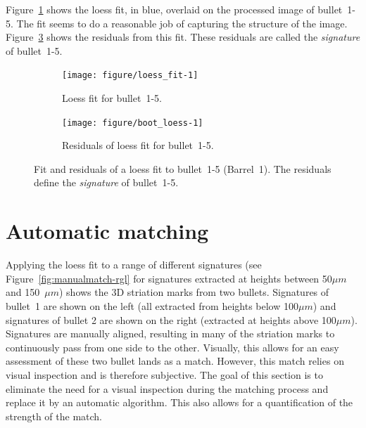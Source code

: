 \documentclass[aoas, preprint]{imsart}\usepackage[]{graphicx}\usepackage[]{color}
\newenvironment{knitrout}{}{} %
\begin{document}
Figure~\ref{fig:loess_fit} shows the loess fit, in blue, overlaid on the processed image of bullet~1-5. The fit seems to do a reasonable job of capturing the structure of the image. %
Figure~\ref{fig:loess_resid} shows the residuals from this fit. These residuals are called the \emph{signature} of bullet~1-5.
%
\begin{figure}[hbtp]
  \centering
\begin{subfigure}[b]{.49\textwidth}\centering
\caption{\label{fig:loess_fit} Loess fit for bullet~1-5.}
\begin{knitrout}
\color{fgcolor}
\texttt{[image: figure/loess\_fit-1]} 

\end{knitrout}
\end{subfigure}
\begin{subfigure}[b]{.49\textwidth}\centering
\caption{\label{fig:loess_resid} Residuals of loess fit for bullet~1-5.
}
\begin{knitrout}
\color{fgcolor}
\texttt{[image: figure/boot\_loess-1]} 

\end{knitrout}
\end{subfigure}
\caption{Fit and residuals of a loess fit to bullet~1-5 (Barrel~1). The residuals define the {\it signature} of bullet~1-5. %
}
\end{figure}
%

\section{Automatic matching}
Applying the loess fit to a range of different signatures (see Figure~\ref{fig:manualmatch-rgl} for signatures extracted at heights between 50$\mu m$ and 150~$\mu m$) shows the 3D striation marks from two bullets. Signatures of bullet~1 are shown on the left (all extracted from heights below 100$\mu m$) and signatures of bullet 2 are shown on the right (extracted at heights above 100$\mu m$). Signatures are manually aligned, resulting in many of the striation marks to continuously pass from one side to the other. Visually, this allows for an easy assessment of these two bullet lands as a match. However, this match relies on visual inspection and is therefore subjective.  The goal of this section is to eliminate the need for a visual inspection during the matching process and replace it by an automatic algorithm. This also allows for a quantification of the strength of the match.
\end{document}

